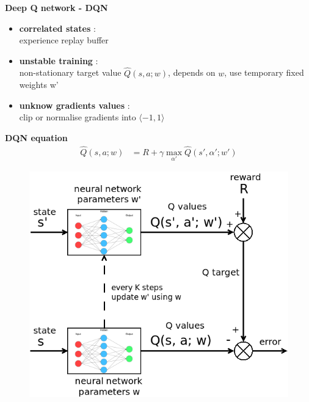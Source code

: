 \documentclass[xcolor=dvipsnames]{beamer}
\begin{document}
\begin{frame}{\bf Deep Q network - DQN}

\begin{itemize}
\item {\bf \color{red} correlated states} : \\
    experience replay buffer\\
\item {\bf \color{red} unstable training} : \\
    non-stationary target value $\hat{Q}(s, a; w)$, depends on $w$, use temporary fixed weights w' \\
\item {\bf \color{red} unknow gradients values} : \\
    clip or normalise gradients into $\langle -1, 1 \rangle$
\end{itemize}
{\bf DQN equation}
\begin{align*}
  \hat{Q}(s, a; w) &= R + \gamma \max \limits_{\alpha'} \hat{Q}(s', \alpha'; w')
  \label{eq:dqn}
\end{align*}



\begin{figure}[!htb]
  \centering
  \includegraphics[scale=0.16]{../../diagrams/dqn.png}
  \label{img:dqn}
\end{figure}


\end{frame}
\end{document}
